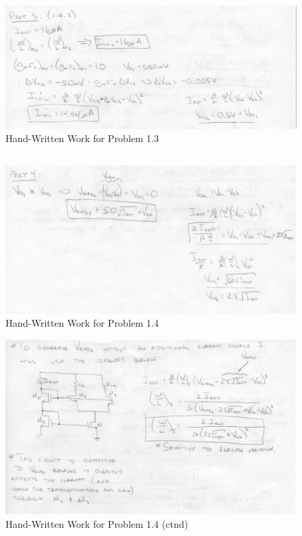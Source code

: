 \documentclass{article}
\begin{document}
\subsection{}
\begin{figure}[H]
\centering
\includegraphics[width=6in]{1_2b}
\caption{Hand-Written Work for Problem 1.3}
\label{1_3}
\end{figure}

\subsection{}
\begin{figure}[H]
\centering
\includegraphics[width=6in]{1_2c}
\caption{Hand-Written Work for Problem 1.4}
\label{1_4}
\end{figure}

\begin{figure}[H]
\centering
\includegraphics[width=6in]{1_3a}
\caption{Hand-Written Work for Problem 1.4 (ctnd)}
\label{1_4cntd}
\end{figure}
\end{document}
